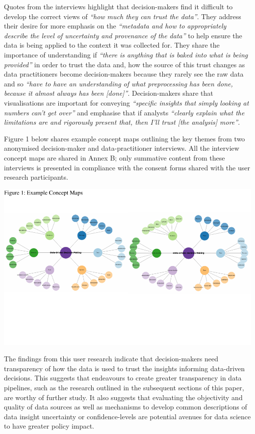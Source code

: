 \documentclass{article}
\begin{document}
Quotes from the interviews highlight that decision-makers find it
difficult to develop the correct views of \emph{``how much they can
trust the data''}. They address their desire for more emphasis on the
\emph{``metadata and how to appropriately describe the level of
uncertainty and provenance of the data''} to help ensure the data is
being applied to the context it was collected for. They share the
importance of understanding if \emph{``there is anything that is baked
into what is being provided''} in order to trust the data and, how the
source of this trust changes as data practitioners become
decision-makers because they rarely see the raw data and so \emph{``have
to have an understanding of what preprocessing has been done, because it
almost always has been {[}done{]}''}. Decision-makers share that
visualisations are important for conveying \emph{``specific insights
that simply looking at numbers can't get over''} and emphasise that if
analysts \emph{``clearly explain what the limitations are and rigorously
present that, then I'll trust {[}the analysis{]} more''}.

Figure 1 below shares example concept maps outlining the key themes from
two anonymised decision-maker and data-practitioner interviews. All the
interview concept maps are shared in Annex B; only summative content
from these interviews is presented in compliance with the consent forms
shared with the user research participants.

\includegraphics{210431461_CSC8639_Dissertation_files/figure-latex/ConceptMapExample-1.pdf}
\vspace{-3.3cm}

The findings from this user research indicate that decision-makers need
transparency of how the data is used to trust the insights informing
data-driven decisions. This suggests that endeavours to create greater
transparency in data pipelines, such as the research outlined in the
subsequent sections of this paper, are worthy of further study. It also
suggests that evaluating the objectivity and quality of data sources as
well as mechanisms to develop common descriptions of data insight
uncertainty or confidence-levels are potential avenues for data science
to have greater policy impact.
\end{document}
